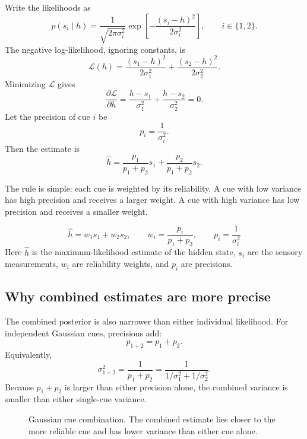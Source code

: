 Write the likelihoods as
\[
p(s_i\mid h)
=
\frac{1}{\sqrt{2\pi\sigma_i^2}}
\exp\!\left[-\frac{(s_i-h)^2}{2\sigma_i^2}\right],
\qquad i\in\{1,2\}.
\]
The negative log-likelihood, ignoring constants, is
\[
\mathcal L(h)
=
\frac{(s_1-h)^2}{2\sigma_1^2}
+
\frac{(s_2-h)^2}{2\sigma_2^2}.
\]
Minimizing \(\mathcal L\) gives
\[
\frac{\partial \mathcal L}{\partial h}
=
\frac{h-s_1}{\sigma_1^2}
+
\frac{h-s_2}{\sigma_2^2}
=0.
\]
Let the precision of cue \(i\) be
\[
p_i=\frac{1}{\sigma_i^2}.
\]
Then the estimate is
\[
\hat h
=
\frac{p_1}{p_1+p_2}s_1
+
\frac{p_2}{p_1+p_2}s_2.
\]

The rule is simple: each cue is weighted by its reliability. A cue with low variance has high precision and receives a larger weight. A cue with high variance has low precision and receives a smaller weight.

\[
\boxed{
\hat h
=
w_1s_1+w_2s_2,
\qquad
w_i=\frac{p_i}{p_1+p_2},
\qquad
p_i=\frac{1}{\sigma_i^2}
}
\]
Here \(\hat h\) is the maximum-likelihood estimate of the hidden state, \(s_i\) are the sensory measurements, \(w_i\) are reliability weights, and \(p_i\) are precisions.

\subsection{Why combined estimates are more precise}

The combined posterior is also narrower than either individual likelihood. For independent Gaussian cues, precisions add:
\[
p_{1+2}=p_1+p_2.
\]
Equivalently,
\[
\sigma_{1+2}^2
=
\frac{1}{p_1+p_2}
=
\frac{1}{1/\sigma_1^2+1/\sigma_2^2}.
\]
Because \(p_1+p_2\) is larger than either precision alone, the combined variance is smaller than either single-cue variance.

\begin{figure}[!htbp]
\centering
{}
\caption{Gaussian cue combination. The combined estimate lies closer to the more reliable cue and has lower variance than either cue alone.}
\end{figure}

